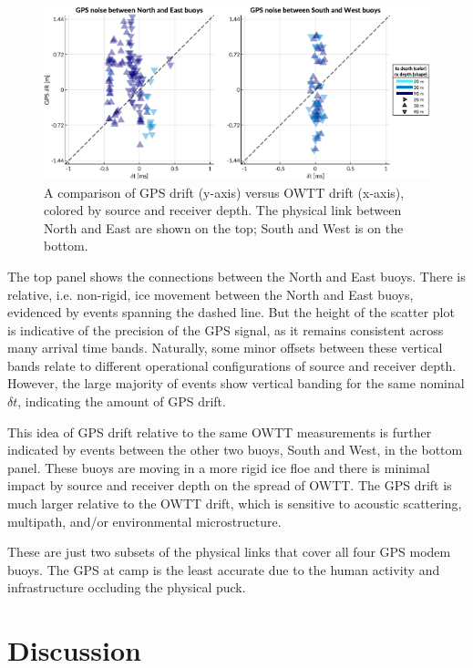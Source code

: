 \begin{figure}[h!]
	\centering
	\includegraphics[width=\reprintcolumnwidth]{figs/gps-drift-example.pdf} 
	\caption{A comparison of GPS drift (y-axis) versus OWTT drift (x-axis), colored by source and receiver depth. The physical link between North and East are shown on the top; South and West is on the bottom.}
	\label{fig:gps-drift-example}
\end{figure}

The top panel shows the connections between the North and East buoys.
There is relative, i.e. non-rigid, ice movement between the North and East buoys, evidenced by events spanning the dashed line.
But the height of the scatter plot is indicative of the precision of the GPS signal, as it remains consistent across many arrival time bands.
Naturally, some minor offsets between these vertical bands relate to different operational configurations of source and receiver depth.
However, the large majority of events show vertical banding for the same nominal $\delta t$, indicating the amount of GPS drift.

This idea of GPS drift relative to the same OWTT measurements is further indicated by events between the other two buoys, South and West, in the bottom panel.
These buoys are moving in a more rigid ice floe and there is minimal impact by source and receiver depth on the spread of OWTT.
The GPS drift is much larger relative to the OWTT drift, which is sensitive to acoustic scattering, multipath, and/or environmental microstructure.

These are just two subsets of the physical links that cover all four GPS modem buoys.
The GPS at camp is the least accurate due to the human activity and infrastructure occluding the physical puck.

\section{Discussion}

